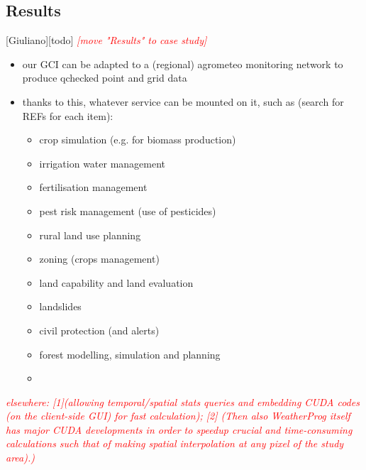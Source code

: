 \documentclass[authoryear,preprint,review,12pt]{elsarticle}
\newcommand{\note}[1]{\emph{\textcolor{red}{#1}}}
\begin{document}
\subsection{Results}[Giuliano][todo]
\note{[move "Results" to case study]}
\begin{itemize}
    \item our GCI can be adapted to a (regional) agrometeo monitoring network to produce qchecked point and grid data
    \item thanks to this, whatever service can be mounted on it, such as (search for REFs for each item):
    \begin{itemize}
        \item crop simulation (e.g. for biomass production)
        \item irrigation water management
        \item fertilisation management
        \item pest risk management (use of pesticides)
        \item rural land use planning
        \item zoning (crops management)
        \item land capability and land evaluation
        \item landslides
        \item civil protection (and alerts)
        \item forest modelling, simulation and planning
        \item 
    \end{itemize}
\end{itemize}

\note{ elsewhere: [1](allowing temporal/spatial stats queries and embedding CUDA codes (on the client-side GUI) for fast calculation); [2] (Then also WeatherProg itself has major CUDA developments in order to speedup crucial and time-consuming calculations such that of making spatial interpolation at any pixel of the study area).) }
\end{document}

